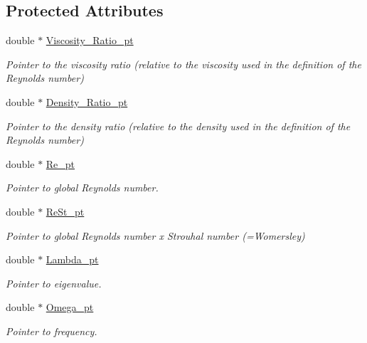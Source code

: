 \subsection*{Protected Attributes}
\begin{DoxyCompactItemize}
\item 
double $\ast$ \hyperlink{classoomph_1_1LinearisedNavierStokesEquations_a901c605744c9bd88ef496383feceee55}{Viscosity\+\_\+\+Ratio\+\_\+pt}
\begin{DoxyCompactList}\small\item\em Pointer to the viscosity ratio (relative to the viscosity used in the definition of the Reynolds number) \end{DoxyCompactList}\item 
double $\ast$ \hyperlink{classoomph_1_1LinearisedNavierStokesEquations_acc13e00d5614dbcb750fd91d415279ac}{Density\+\_\+\+Ratio\+\_\+pt}
\begin{DoxyCompactList}\small\item\em Pointer to the density ratio (relative to the density used in the definition of the Reynolds number) \end{DoxyCompactList}\item 
double $\ast$ \hyperlink{classoomph_1_1LinearisedNavierStokesEquations_abffa39aae651bc6fd39409b004dd247e}{Re\+\_\+pt}
\begin{DoxyCompactList}\small\item\em Pointer to global Reynolds number. \end{DoxyCompactList}\item 
double $\ast$ \hyperlink{classoomph_1_1LinearisedNavierStokesEquations_ab40d84a723664869c2e6ce163c712ec6}{Re\+St\+\_\+pt}
\begin{DoxyCompactList}\small\item\em Pointer to global Reynolds number x Strouhal number (=Womersley) \end{DoxyCompactList}\item 
double $\ast$ \hyperlink{classoomph_1_1LinearisedNavierStokesEquations_a7ad98ab2eaa268bfb6a2a92122f42ae6}{Lambda\+\_\+pt}
\begin{DoxyCompactList}\small\item\em Pointer to eigenvalue. \end{DoxyCompactList}\item 
double $\ast$ \hyperlink{classoomph_1_1LinearisedNavierStokesEquations_af4ef888df31fc1283960078bb4bc01fd}{Omega\+\_\+pt}
\begin{DoxyCompactList}\small\item\em Pointer to frequency. \end{DoxyCompactList}\item 

\end{DoxyCompactItemize}
